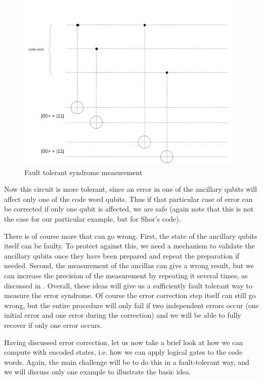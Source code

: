 \documentclass[a4paper, draft]{article}
\theoremstyle{own}
\theoremstyle{remark}
\begin{document}
\begin{figure}[ht]
\centering
\includegraphics[width=1.0\linewidth]{images/FaultTolerantSyndromeMeasurement}
\caption[Fault tolerant syndrome measurement]{Fault tolerant syndrome measurement}
\label{fig:FaultTolerantSyndromeMeasurement}
\end{figure}

Now this circuit is more tolerant, since an error in one of the ancillary qubits will affect only one of the code word qubits. Thus if that particular case of error can be corrected if only one qubit is affected, we are safe (again note that this is not the case for our particular example, but for Shor's code).

There is of course more that can go wrong. First, the state of the ancillary qubits itself can be faulty. To protect against this, we need a mechanism to validate the ancillary qubits once they have been prepared and repeat the preparation if needed. Second, the measurement of the ancillas can give a wrong result, but we can increase the precision of the measurement by repeating it several times, as discussed in \cite{Shor96}. Overall, these ideas will give us a sufficiently fault tolerant way to measure the error syndrome. Of course the error correction step itself can still go wrong, but the entire procedure will only fail if two independent errors occur (one initial error and one error during the correction) and we will be able to fully recover if only one error occurs.

Having discussed error correction, let us now take a brief look at how we can compute with encoded states, i.e. how we can apply logical gates to the code words. Again, the main challenge will be to do this in a fault-tolerant way, and we will discuss only one example to illustrate the basic idea.
\end{document}
